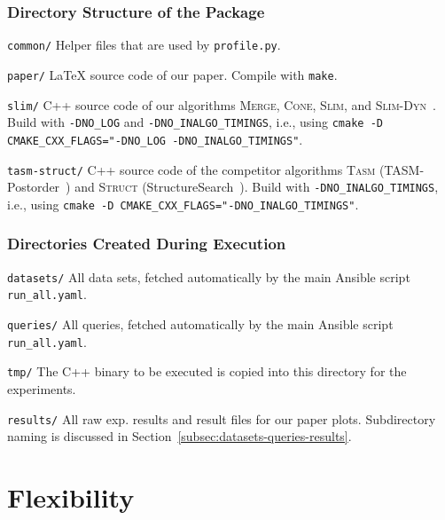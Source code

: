 \documentclass[a4, 10pt]{article}
\newenvironment{packed_descr}{
\begin{description}
  \setlength{\itemsep}{1pt}
  \setlength{\parskip}{0pt}
  \setlength{\parsep}{0pt}
}{\end{description}}
\begin{document}
\subsubsection{Directory Structure of the Package}

\begin{packed_descr}
  \item[\texttt{common/}] Helper files that are used by \texttt{profile.py}.
  \item[\texttt{paper/}] \LaTeX{} source code of our paper. Compile with \texttt{make}.
  \item[\texttt{slim/}] C++ source code of our algorithms \textsc{Merge}, \textsc{Cone}, \textsc{Slim}, and \textsc{Slim-Dyn}~\cite{kocher-sigmod-2019}. Build with \texttt{-DNO\_LOG} and \texttt{-DNO\_INALGO\_TIMINGS}, i.e., using \texttt{cmake -D CMAKE\_CXX\_FLAGS="-DNO\_LOG -DNO\_INALGO\_TIMINGS"}.
  \item[\texttt{tasm-struct/}] C++ source code of the competitor algorithms \textsc{Tasm} (TASM-Postorder~\cite{augsten-icde-2010}) and \textsc{Struct} (StructureSearch~\cite{cohen-sigmod-2013}). Build with \texttt{-DNO\_INALGO\_TIMINGS}, i.e., using \texttt{cmake -D CMAKE\_CXX\_FLAGS="-DNO\_INALGO\_TIMINGS"}.
\end{packed_descr}

\subsubsection{Directories Created During Execution}

\begin{packed_descr}
  \item[\texttt{datasets/}] All data sets, fetched automatically by the main Ansible script \texttt{run\_all.yaml}.
  \item[\texttt{queries/}] All queries, fetched automatically by the main Ansible script \texttt{run\_all.yaml}.
  \item[\texttt{tmp/}] The C++ binary to be executed is copied into this directory for the experiments.
  \item[\texttt{results/}] All raw exp. results and result files for our paper plots. Subdirectory naming is discussed in Section~\ref{subsec:datasets-queries-results}.
\end{packed_descr}

\section{Flexibility}
\end{document}
